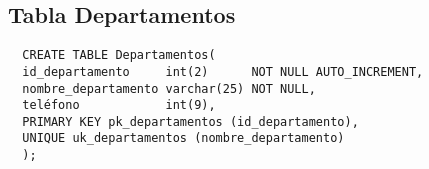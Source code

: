 \subsection{Tabla Departamentos}

\begin{verbatim}
  CREATE TABLE Departamentos(
  id_departamento     int(2)      NOT NULL AUTO_INCREMENT,
  nombre_departamento varchar(25) NOT NULL,
  teléfono            int(9),
  PRIMARY KEY pk_departamentos (id_departamento),
  UNIQUE uk_departamentos (nombre_departamento)
  );
\end{verbatim}